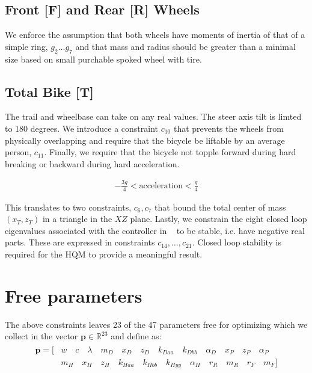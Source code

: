 \documentclass{bmd2019a}
\begin{document}
\subsection{Front [F] and Rear [R] Wheels}
%
We enforce the assumption that both wheels have moments of inertia of that of a
simple ring, $g_2 \ldots g_7$ and that mass and radius should be greater than a
minimal size based on small purchable spoked wheel with tire.

\subsection{Total Bike [T]}
%
The trail and wheelbase can take on any real values. The steer axis tilt is
limted to 180 degrees. We introduce a constraint $c_{10}$ that prevents the
wheels from physically overlapping and require that the bicycle be liftable by
an average person, $c_{11}$. Finally, we require that the bicycle not topple
forward during hard breaking or backward during hard acceleration.

\begin{align}
  -\frac{3g}{4} < \textrm{acceleration} < \frac{g}{4}
\end{align}

This translates to two constraints, $c_6,c_7$ that bound the total center of
mass $(x_T,z_T)$ in a triangle in the $XZ$ plane. Lastly, we constrain the
eight closed loop eigenvalues associated with the controller in
~\cite{Hess2012} to be stable, i.e. have negative real parts.  These are
expressed in constraints $c_{14},\ldots,c_{21}$. Closed loop stability is
required for the HQM to provide a meaningful result.

\section{Free parameters}
%
The above constraints leaves 23 of the 47 parameters free for optimizing which
we collect in the vector $\mathbf{p}\in\mathbb{R}^{23}$ and define as:
%
\begin{align}
  \begin{split}
    \mathbf{p} = [ &
       w        \quad
       c        \quad
       \lambda  \quad
       m_D      \quad
       x_D      \quad
       z_D      \quad
       k_{Daa}  \quad
       k_{Dbb}  \quad
       \alpha_D \quad
       x_P      \quad
       z_P      \quad
       \alpha_P \\
     & m_H      \quad
       x_H      \quad
       z_H      \quad
       k_{Haa}  \quad
       k_{Hbb}  \quad
       k_{Hyy}  \quad
       \alpha_H \quad
       r_R      \quad
       m_R      \quad
       r_F      \quad
       m_F]
  \end{split}
\end{align}
\end{document}
